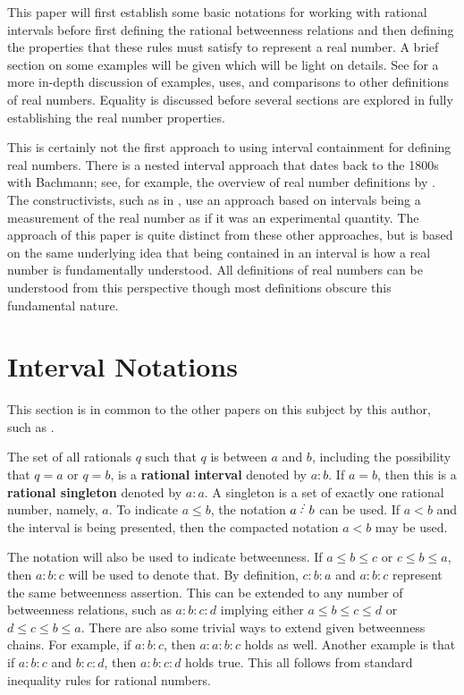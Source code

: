 \documentclass[12pt]{article}
\begin{document}
This paper will first establish some basic notations for working with rational intervals before first defining the rational betweenness relations and then defining the properties that these rules must satisfy to represent a real number. A brief section on some examples will be given which will be light on details. See \cite{taylor23main} for a more in-depth discussion of examples, uses, and comparisons to other definitions of real numbers. Equality is discussed before several sections are explored in fully establishing the real number properties. 

This is certainly not the first approach to using interval containment for defining real numbers. There is a nested interval approach that dates back to the 1800s with Bachmann; see, for example, the overview of real number definitions by \cite{ittay-2015}. The constructivists, such as in \cite{bridger}, use an approach based on intervals being a measurement of the real number as if it was an experimental quantity. The approach of this paper is quite distinct from these other approaches, but is based on the same underlying idea that being contained in an interval is how a real number is fundamentally understood. All definitions of real numbers can be understood from this perspective though most definitions obscure this fundamental nature. 

\section{Interval Notations}

This section is in common to the other papers on this subject by this author, such as \cite{taylor24dedekind}.

The set of all rationals $q$ such that $q$ is between $a$ and $b$, including the possibility that $q=a$ or $q=b$, is a \textbf{rational interval} denoted by $a:b$. If $a=b$, then this is a \textbf{rational singleton} denoted by $a:a$. A singleton is a set of exactly one rational number, namely, $a$. To indicate $a \leq b$, the notation $a \lte b$ can be used. If $a < b$ and the interval is being presented, then the compacted notation $a \lt b$ may be used. 

The notation will also be used to indicate betweenness. If $a \leq b \leq c$ or $c \leq b \leq a$, then $a:b:c$ will be used to denote that. By definition, $c:b:a$ and $a:b:c$ represent the same betweenness assertion. This can be extended to any number of betweenness relations, such as $a:b:c:d$ implying either $a \leq b \leq c \leq d$ or $d \leq c \leq b \leq a$. There are also some trivial ways to extend given betweenness chains. For example, if $a:b:c$, then $a:a:b:c$ holds as well. Another example is that if $a:b:c$ and $b:c:d$, then $a:b:c:d$ holds true. This all follows from standard inequality rules for rational numbers. 
\end{document}
